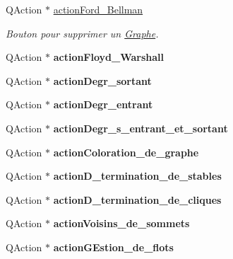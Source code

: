 \begin{DoxyCompactItemize}
Q\+Action $\ast$ \hyperlink{classUi__MainWindow_aaefc17e81d820b51fedf1cdbfa948902}{action\+Ford\+\_\+\+Bellman}
\begin{DoxyCompactList}\small\item\em Bouton pour supprimer un \hyperlink{classGraphe}{Graphe}. \end{DoxyCompactList}\item 
\mbox{\label{classUi__MainWindow_a53eece6c5397ce02cc8f7445ae41b632}} 
Q\+Action $\ast$ {\bfseries action\+Floyd\+\_\+\+Warshall}
\item 
\mbox{\label{classUi__MainWindow_ad7f6842a4c5dfa2ec39003d0a20c6855}} 
Q\+Action $\ast$ {\bfseries action\+Degr\+\_\+sortant}
\item 
\mbox{\label{classUi__MainWindow_a5980416ef802d01c932d6475be8c7d88}} 
Q\+Action $\ast$ {\bfseries action\+Degr\+\_\+entrant}
\item 
\mbox{\label{classUi__MainWindow_aa1895f84de057eba6a62ae0cf168aa6d}} 
Q\+Action $\ast$ {\bfseries action\+Degr\+\_\+s\+\_\+entrant\+\_\+et\+\_\+sortant}
\item 
\mbox{\label{classUi__MainWindow_a785022e2b1a7d48b0a808fe5743f2f40}} 
Q\+Action $\ast$ {\bfseries action\+Coloration\+\_\+de\+\_\+graphe}
\item 
\mbox{\label{classUi__MainWindow_a93acf91ba3dbe04f23f9d5ac3cb84867}} 
Q\+Action $\ast$ {\bfseries action\+D\+\_\+termination\+\_\+de\+\_\+stables}
\item 
\mbox{\label{classUi__MainWindow_a952bdc9d69c2c786fe739947686e5115}} 
Q\+Action $\ast$ {\bfseries action\+D\+\_\+termination\+\_\+de\+\_\+cliques}
\item 
\mbox{\label{classUi__MainWindow_a473eddfb72293e1084e181fb46d3b60a}} 
Q\+Action $\ast$ {\bfseries action\+Voisins\+\_\+de\+\_\+sommets}
\item 
\mbox{\label{classUi__MainWindow_a33689d321ff80dc097878272bd219a1a}} 
Q\+Action $\ast$ {\bfseries action\+G\+Estion\+\_\+de\+\_\+flots}

\end{DoxyCompactItemize}
